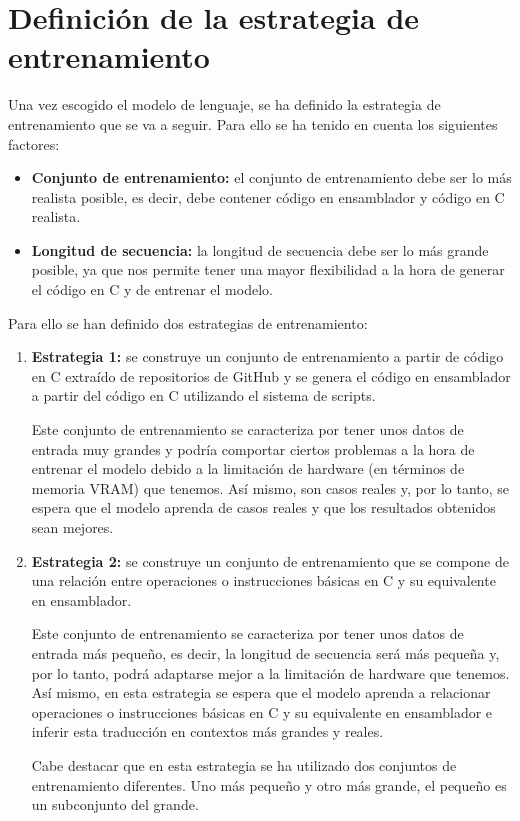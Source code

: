 \section{Definición de la estrategia de entrenamiento}
\label{sec:estrategia_entrenamiento}


Una vez escogido el modelo de lenguaje, se ha definido la estrategia de entrenamiento
que se va a seguir. Para ello se ha tenido en cuenta los siguientes factores:

\begin{itemize}
    \item \textbf{Conjunto de entrenamiento:} el conjunto de entrenamiento debe ser
        lo más realista posible, es decir, debe contener código en ensamblador y código
        en C realista.
    \item \textbf{Longitud de secuencia:} la longitud de secuencia debe ser lo más
        grande posible, ya que nos permite tener una mayor flexibilidad a la hora de
        generar el código en C y de entrenar el modelo.
\end{itemize}

Para ello se han definido dos estrategias de entrenamiento:

\begin{enumerate}
    \item \textbf{Estrategia 1:} se construye un conjunto de entrenamiento a partir
        de código en C extraído de repositorios de GitHub y se genera el código en
        ensamblador a partir del código en C utilizando el sistema de scripts.

        Este conjunto de entrenamiento se caracteriza por tener unos datos de entrada
        muy grandes y podría comportar ciertos problemas a la hora de entrenar el modelo
        debido a la limitación de hardware (en términos de memoria VRAM) que tenemos. Así
        mismo, son casos reales y, por lo tanto, se espera que el modelo aprenda de casos
        reales y que los resultados obtenidos sean mejores.

    \item \textbf{Estrategia 2:} se construye un conjunto de entrenamiento que se compone
        de una relación entre operaciones o instrucciones básicas en C y su equivalente
        en ensamblador.

        Este conjunto de entrenamiento se caracteriza por tener unos datos de entrada
        más pequeño, es decir, la longitud de secuencia será más pequeña y, por lo tanto,
        podrá adaptarse mejor a la limitación de hardware que tenemos. Así mismo, en esta 
        estrategia se espera que el modelo aprenda a relacionar operaciones o instrucciones
        básicas en C y su equivalente en ensamblador e inferir esta traducción en contextos más
        grandes y reales.

        Cabe destacar que en esta estrategia se ha utilizado dos conjuntos de entrenamiento
        diferentes. Uno más pequeño y otro más grande, el pequeño es un subconjunto del grande.
\end{enumerate}

